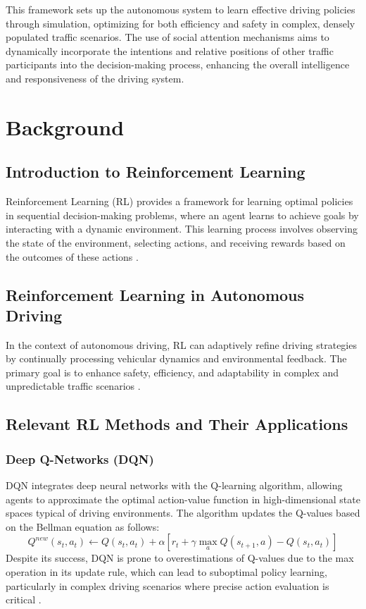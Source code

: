 \documentclass{article}
\begin{document}
This framework sets up the autonomous system to learn effective driving policies through simulation, optimizing for both efficiency and safety in complex, densely populated traffic scenarios. The use of social attention mechanisms aims to dynamically incorporate the intentions and relative positions of other traffic participants into the decision-making process, enhancing the overall intelligence and responsiveness of the driving system.

\section{Background}

\subsection{Introduction to Reinforcement Learning}
Reinforcement Learning (RL) provides a framework for learning optimal policies in sequential decision-making problems, where an agent learns to achieve goals by interacting with a dynamic environment. This learning process involves observing the state of the environment, selecting actions, and receiving rewards based on the outcomes of these actions \citep{7339478}.

\subsection{Reinforcement Learning in Autonomous Driving}
In the context of autonomous driving, RL can adaptively refine driving strategies by continually processing vehicular dynamics and environmental feedback. The primary goal is to enhance safety, efficiency, and adaptability in complex and unpredictable traffic scenarios \citep{7339478}.

\subsection{Relevant RL Methods and Their Applications}

\subsubsection{Deep Q-Networks (DQN)}
DQN integrates deep neural networks with the Q-learning algorithm, allowing agents to approximate the optimal action-value function in high-dimensional state spaces typical of driving environments. The algorithm updates the Q-values based on the Bellman equation as follows:
\[
Q^{new}(s_t, a_t) \leftarrow Q(s_t, a_t) + \alpha \left[r_t + \gamma \max_{a}Q(s_{t+1}, a) - Q(s_t, a_t)\right]
\]
Despite its success, DQN is prone to overestimations of Q-values due to the max operation in its update rule, which can lead to suboptimal policy learning, particularly in complex driving scenarios where precise action evaluation is critical \citep{DBLP:journals/corr/HasseltGS15}.
\end{document}
